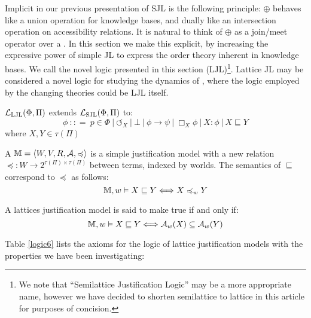 Implicit in our previous presentation of SJL is the following
principle: 
 $\oplus$ behaves like a union
operation for knowledge bases, and dually like an intersection operation on
accessibility relations.  It is natural to think of $\oplus$ as a join/meet
operator over a {}.  In this section we make this
explicit, by increasing the expressive power of simple JL to express the order
theory inherent in knowledge bases.  We call the novel logic presented in
this section  (LJL){\footnote{We note
that ``Semilattice Justification Logic'' may be a more appropriate name,
however we have decided to shorten semilattice to lattice in this article
for purposes of concision.}}.  Lattice JL may be considered a novel logic for
studying the dynamics of , where the logic employed by
the changing theories could be LJL itself.



\begin{definition}
  $\mathcal{L}_{\tmop{LJL}} (\Phi, \Pi)$ extends $\mathcal{L}_{\tmop{SJL}}
  (\Phi, \Pi)$ to:
  \[ \phi \  : : = \  p \in \Phi \  |
     \  \circlearrowleft_X \  | \  \bot
     \  | \  \phi \rightarrow \psi \  |
     \  \Box_X \phi \  | \  X : \phi
     \  | \  X \sqsubseteq Y \]
  where $X, Y \in \tau (\Pi)$
\end{definition}

\begin{definition}
  \label{justmodels}A {} $\mathbbm{M}=
  \langle W, V, R, \mathcal{A}, \preccurlyeq \rangle$ is a simple
  justification model with a new relation $\preccurlyeq : W \rightarrow
  2^{\tau (\Pi) \times \tau (\Pi)}$ between terms, indexed by worlds.  The
  semantics of $\sqsubseteq$ correspond to $\preccurlyeq$ as follows:
  \[ \mathbbm{M}, w \vDash X \sqsubseteq Y \Longleftrightarrow X
     \preccurlyeq_w Y \]
\end{definition}

\begin{definition}
  A lattices justification model is said to make true  if
  and only if:
  \[ \mathbbm{M}, w \vDash X \sqsubseteq Y \Longleftrightarrow \mathcal{A}_w
     (X) \subseteq \mathcal{A}_w (Y) \]
\end{definition}

Table \ref{logic6} lists the axioms for the logic of lattice justification
models with the properties we have been investigating:

